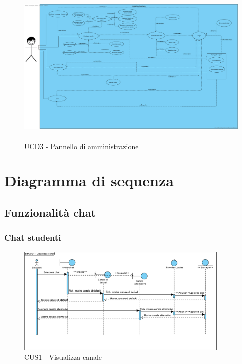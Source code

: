 \begin{figure}
	\centering
	\includegraphics[height=3in]{imgs/gruppo6/use_case_diagrams/ucd3_pannello.pdf}
	\caption{UCD3 - Pannello di amministrazione}
	\label{fig:ucd3-amm}
\end{figure}


\newpage
\section{Diagramma di sequenza}

\subsection{Funzionalità chat}

\subsubsection{Chat studenti}
\begin{figure}[!h]
	\centering
	\includegraphics[width=0.9\textwidth]{imgs/gruppo6/sequence/CUS1_visualizza_canale.pdf}
	\caption{CUS1 - Visualizza canale}
	\label{fig:seq-cus1}
\end{figure}

